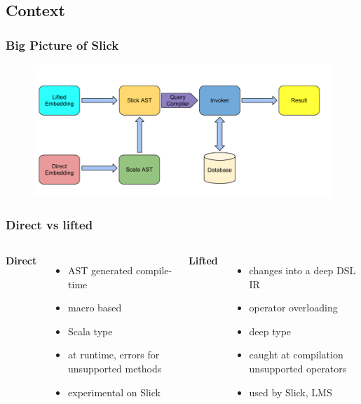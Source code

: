 \documentclass{beamer}
\begin{document}
\subsection{Context}

\begin{frame}
\frametitle{Big Picture of Slick}

\begin{figure}
\includegraphics[width=0.8\linewidth]{./img/bigp.png}
\end{figure}

\end{frame}



\begin{frame}
\frametitle{Direct vs lifted}

\begin{columns}[c] %

\textbf{Direct}
\begin{itemize}
\item AST generated compile-time 
\item macro based
\item Scala type
\item at runtime, errors for unsupported methods
\item  experimental on Slick
\end{itemize}

\textbf{Lifted}
\begin{itemize}
\item changes into a deep DSL IR
\item operator overloading
\item deep type
\item caught at compilation unsupported operators
\item used by Slick, LMS
\end{itemize}

\end{columns}

\end{frame}
\end{document}
